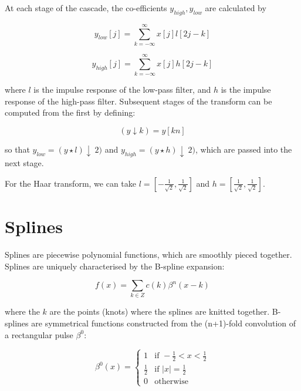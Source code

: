 \documentclass{article}
\begin{document}
At each stage of the cascade, the co-efficients \(y_{high}, y_{low}\) are calculated by 

\begin{equation}
y_{low}[j] = \sum_{k=-\infty}^{\infty} x[j]l[2j-k]
\end{equation}

\begin{equation}
y_{high}[j] = \sum_{k=-\infty}^{\infty} x[j]h[2j-k]
\end{equation}

where \(l\) is the impulse response of the low-pass filter, and \(h\) is the impulse response of the high-pass filter. Subsequent stages of the transform can be computed from the first by defining:

\begin{equation}
(y \downarrow k) = y[kn]
\end{equation}

so that \( y_{low} = (y \star l)\downarrow\ 2) \) and \(y_{high} = (y \star h)\downarrow\ 2)\), which are passed into the next stage.

For the Haar transform, we can take \(l = [-\frac{1}{\sqrt{2}},\frac{1}{\sqrt{2}}]\) and \(h =  [\frac{1}{\sqrt{2}}, \frac{1}{\sqrt{2}}]\).

\section{Splines}
Splines are piecewise polynomial functions, which are smoothly pieced together. Splines are uniquely characterised by the B-spline expansion:

\begin{equation}
f\left(x\right) = \sum_{k \in Z} c\left(k\right) \beta^n \left(x-k \right)
\end{equation}

where the \(k\) are the points (knots) where the splines are knitted together. B-splines are symmetrical functions constructed from the (n+1)-fold convolution of a rectangular pulse \(\beta^0\):

\begin{equation}
\beta^0 \left(x\right) =
\begin{cases}
 1 & \text{if } -\frac{1}{2} < x <  \frac{1}{2} \\
\frac{1}{2} & \text{if } |x|=\frac{1}{2} \\
0 & \text{otherwise} 
\end{cases}
\end{equation}
\end{document}
